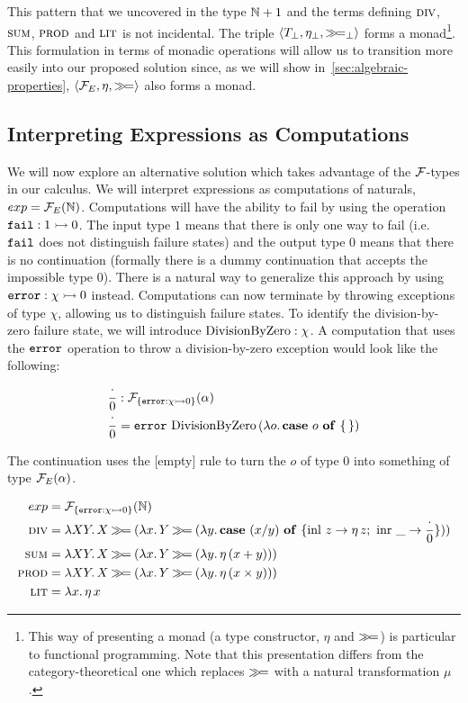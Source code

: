 This pattern that we uncovered in the type $\mathbb{N} + 1$ and the terms defining
$\textsc{div}$, $\textsc{sum}$, $\textsc{prod}$ and $\textsc{lit}$ is not incidental. The triple
$\left<T_\bot, \eta_\bot, \mathbin{\gg\!=}_\bot \right>$ forms a monad\footnote{This
  way of presenting a monad (a type constructor, $\eta$ and $\mathbin{\gg\!=}$) is
  particular to functional programming. Note that this presentation differs
  from the category-theoretical one which replaces $\mathbin{\gg\!=}$ with a natural
  transformation $\mu$ \cite{mac1978categories}.}. This formulation in
terms of monadic operations will allow us to transition more easily into
our proposed solution since, as we will show
in~\ref{sec:algebraic-properties}, $\left< \mathcal{F}_E, \eta, \mathbin{\gg\!=} \right>$
also forms a monad.

\subsection{Interpreting Expressions as Computations}

We will now explore an alternative solution which takes advantage of the
$\mathcal{F}$-types in our calculus. We will interpret expressions as computations
of naturals, $exp = \mathcal{F}_E(\mathbb{N})$. Computations will have the ability to fail
by using the operation $\mathtt{fail} : 1 \rightarrowtail 0$. The input type $1$ means
that there is only one way to fail (i.e.\ $\mathtt{fail}$ does not distinguish
failure states) and the output type $0$ means that there is no continuation
(formally there is a dummy continuation that accepts the impossible type
$0$). There is a natural way to generalize this approach by using
$\mathtt{error} : \chi \rightarrowtail 0$ instead. Computations can now terminate by
throwing exceptions of type $\chi$, allowing us to distinguish failure
states. To identify the division-by-zero failure state, we will introduce
$\operatorname{DivisionByZero} : \chi$. A computation that uses the $\mathtt{error}$ operation to
throw a division-by-zero exception would look like the following:

\begin{align*}
  \frac{\cdot}{0} &: \mathcal{F}_{\{\mathtt{error} : \chi \rightarrowtail 0\}}(\alpha) \\
  \frac{\cdot}{0} &= \mathtt{error}\,\operatorname{DivisionByZero}\,(\lambda o.\, \text{\textbf{case} $o$ \textbf{of} \{\,\}})
\end{align*}

The continuation uses the [empty] rule to turn the $o$ of type $0$ into
something of type $\mathcal{F}_E(\alpha)$.

\begin{align*}
  exp &= \mathcal{F}_{\{\mathtt{error} : \chi \rightarrowtail 0\}}(\mathbb{N}) \\
  \textsc{div} &= \lambda X Y.\, X \mathbin{\gg\!=} (\lambda x.\, Y \mathbin{\gg\!=} (\lambda y.\, \text{\textbf{case} $(x / y)$ \textbf{of} $\{ \operatorname{inl}\,z \to \eta\,z;\ \operatorname{inr}\,\_ \to \frac{\cdot}{0} \}$})) \\
  \textsc{sum} &= \lambda X Y.\, X \mathbin{\gg\!=} (\lambda x.\, Y \mathbin{\gg\!=} (\lambda y.\, \eta\,(x + y))) \\
  \textsc{prod} &= \lambda X Y.\, X \mathbin{\gg\!=} (\lambda x.\, Y \mathbin{\gg\!=} (\lambda y.\, \eta\,(x \times y))) \\
  \textsc{lit} &= \lambda x.\, \eta\,x
\end{align*}


